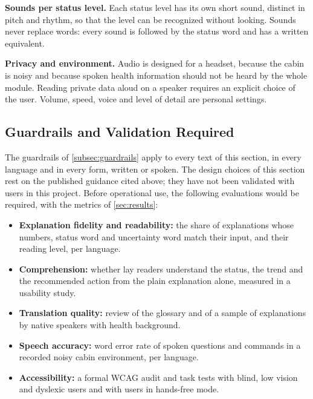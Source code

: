 \medskip\noindent\textbf{Sounds per status level.} Each status level has its own short sound, distinct in pitch and rhythm, so that the level can be recognized without looking. Sounds never replace words: every sound is followed by the status word and has a written equivalent.

\medskip\noindent\textbf{Privacy and environment.} Audio is designed for a headset, because the cabin is noisy and because spoken health information should not be heard by the whole module. Reading private data aloud on a speaker requires an explicit choice of the user. Volume, speed, voice and level of detail are personal settings.

\subsection{Guardrails and Validation Required}
\label{subsec:inclusion-evaluation}

The guardrails of \ref{subsec:guardrails} apply to every text of this section, in every language and in every form, written or spoken. The design choices of this section rest on the published guidance cited above; they have not been validated with users in this project. Before operational use, the following evaluations would be required, with the metrics of \ref{sec:results}:

\begin{itemize}
\item \textbf{Explanation fidelity and readability:} the share of explanations whose numbers, status word and uncertainty word match their input, and their reading level, per language.
\item \textbf{Comprehension:} whether lay readers understand the status, the trend and the recommended action from the plain explanation alone, measured in a usability study.
\item \textbf{Translation quality:} review of the glossary and of a sample of explanations by native speakers with health background.
\item \textbf{Speech accuracy:} word error rate of spoken questions and commands in a recorded noisy cabin environment, per language.
\item \textbf{Accessibility:} a formal WCAG audit and task tests with blind, low vision and dyslexic users and with users in hands-free mode.
\end{itemize}
